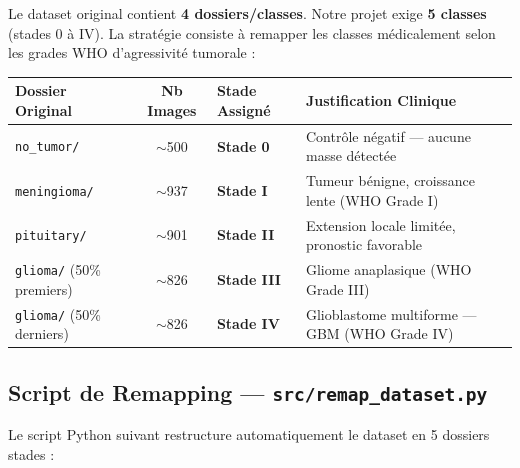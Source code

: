 \documentclass[12pt,a4paper]{article}
\begin{document}
Le dataset original contient \textbf{4 dossiers/classes}. Notre projet exige \textbf{5 classes} (stades 0 à IV). La stratégie consiste à remapper les classes médicalement selon les grades WHO d'agressivité tumorale :

\vspace{0.3cm}
\begin{center}
\begin{tabular}{|l|c|l|l|}
\hline
\rowcolor{primaryBlue!20}
\textbf{Dossier Original} & \textbf{Nb Images} & \textbf{Stade Assigné} & \textbf{Justification Clinique} \\
\hline
\texttt{no\_tumor/}   & $\sim$500  & \textbf{Stade 0} & Contrôle négatif — aucune masse détectée \\
\hline
\texttt{meningioma/}  & $\sim$937  & \textbf{Stade I} & Tumeur bénigne, croissance lente (WHO Grade I) \\
\hline
\texttt{pituitary/}   & $\sim$901  & \textbf{Stade II} & Extension locale limitée, pronostic favorable \\
\hline
\texttt{glioma/} (50\% premiers) & $\sim$826 & \textbf{Stade III} & Gliome anaplasique (WHO Grade III) \\
\hline
\texttt{glioma/} (50\% derniers) & $\sim$826 & \textbf{Stade IV} & Glioblastome multiforme — GBM (WHO Grade IV) \\
\hline
\end{tabular}
\end{center}

\vspace{0.4cm}

\subsection*{Script de Remapping — \texttt{src/remap\_dataset.py}}

Le script Python suivant restructure automatiquement le dataset en 5 dossiers stades :
\end{document}
